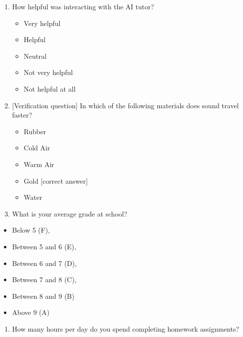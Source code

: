 \documentclass[
  12pt,
]{article}
\providecommand{\tightlist}{%
  \setlength{\itemsep}{0pt}\setlength{\parskip}{0pt}}
\begin{document}
\begin{enumerate}
  \begin{itemize}
  \tightlist
  \item
    Very confident
  \item
    Confident
  \item
    Neutral
  \item
    Not very confident
  \item
    Not confident at all
  \end{itemize}
\item
  How helpful was interacting with the AI tutor?

  \begin{itemize}
  \tightlist
  \item
    Very helpful
  \item
    Helpful
  \item
    Neutral
  \item
    Not very helpful
  \item
    Not helpful at all
  \end{itemize}
\item
  {[}Verification question{]} In which of the following materials does sound travel faster?

  \begin{itemize}
  \tightlist
  \item
    Rubber
  \item
    Cold Air
  \item
    Warm Air
  \item
    Gold {[}correct answer{]}
  \item
    Water
  \end{itemize}
\item
  What is your average grade at school?
\end{enumerate}

\begin{itemize}
\tightlist
\item
  Below 5 (F),
\item
  Between 5 and 6 (E),
\item
  Between 6 and 7 (D),
\item
  Between 7 and 8 (C),
\item
  Between 8 and 9 (B)
\item
  Above 9 (A)
\end{itemize}

\begin{enumerate}
\def\labelenumi{\arabic{enumi}.}
\setcounter{enumi}{26}
\tightlist
\item
  How many hours per day do you spend completing homework assignments?
\end{enumerate}
\end{document}
